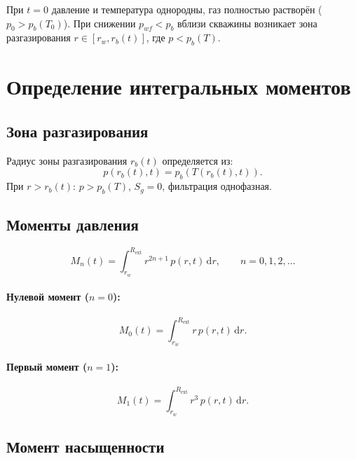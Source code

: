 \documentclass[12pt,a4paper]{article}
\newcommand{\dd}{\mathrm{d}}
\newcommand{\ext}{\mathrm{ext}}
\begin{document}
При $t = 0$ давление и температура однородны, газ полностью
растворён ($p_0 > p_b(T_0)$). При снижении $p_{wf} < p_b$
вблизи скважины возникает зона разгазирования
$r \in [r_w, r_b(t)]$, где $p < p_b(T)$.


\section{Определение интегральных моментов}\label{sec:moments_def}

\subsection{Зона разгазирования}

Радиус зоны разгазирования $r_b(t)$ определяется из:
\begin{equation}\label{eq:rb}
  p(r_b(t), t) = p_b(T(r_b(t), t)).
\end{equation}
При $r > r_b(t)$: $p > p_b(T)$, $S_g = 0$, фильтрация однофазная.

\subsection{Моменты давления}

\begin{equation}\label{eq:Mn}
  M_n(t) = \int_{r_w}^{R_\ext} r^{2n+1}\,p(r,t)\,\dd r,
  \qquad n = 0, 1, 2, \ldots
\end{equation}

\paragraph{Нулевой момент ($n = 0$):}
\begin{equation}\label{eq:M0}
  M_0(t) = \int_{r_w}^{R_\ext} r\,p(r,t)\,\dd r.
\end{equation}

\paragraph{Первый момент ($n = 1$):}
\begin{equation}\label{eq:M1}
  M_1(t) = \int_{r_w}^{R_\ext} r^3\,p(r,t)\,\dd r.
\end{equation}

\subsection{Момент насыщенности}
\end{document}
